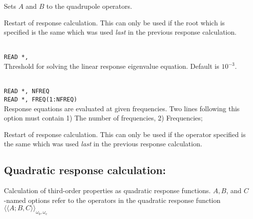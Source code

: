 \begin{description}
\item{}
Sets $A$ and $B$ to the quadrupole operators.

\item{}
Restart of response
calculation. This can only be used if the root which is 
specified is the same which was used \textit{last} in the previous
response calculation.

\item{}\\
\verb|READ *,|\\
Threshold for solving the linear response eigenvalue equation. 
Default is $10^{-3}$.

\item{}\\
\verb|READ *, NFREQ|\\
\verb|READ *, FREQ(1:NFREQ)|\\
Response equations are evaluated at given
frequencies. Two lines following 
this option must contain 1) The number of frequencies, 2) Frequencies;
 
\item{}
Restart of response calculation. This
can only be used if the  
operator specified is the same which was used \textit{last} in the previous
response calculation.


\end{description}

\subsection{Quadratic response calculation: }

Calculation of third-order properties as quadratic response
functions.
$A,B$, and $C$-named options refer to the operators in the quadratic
response function 
$\langle\!\langle A;B,C \rangle\!\rangle_{\omega_b,\omega_c}$
\cite{ovhapjhjajthjojcp97,hhhjajpjjojcp97,haovhkpjthjcp98}

